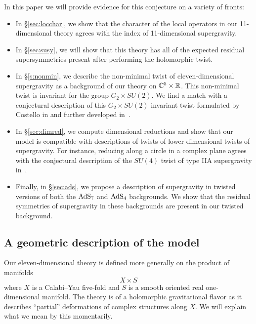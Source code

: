 In this paper we will provide evidence for this conjecture on a variety of fronts:
\begin{itemize}[leftmargin=\parindent,itemsep=\parskip]
\item 
In \S\ref{sec:locchar}, we show that the character of the local operators in our 11-dimensional theory agrees with the index of 11-dimensional supergravity. 
\item
In \S\ref{sec:susy}, we will show that this theory has all of the expected residual supersymmetries present after performing the holomorphic twist.

\item
In \S\ref{s:nonmin}, we describe the non-minimal twist of eleven-dimensional supergravity as a background of our theory on $\mathbb C^5 \times \mathbb R$. 
This non-minimal twist is invariant for the group $G_2 \times SU(2)$. 
We find a match with a conjectural description of this $G_2 \times SU(2)$ invariant twist formulated by Costello in \cite{CostelloM5} and further developed in~\cite{RY}.  
\item In \S\ref{sec:dimred}, we compute dimensional reductions and show that our model is compatible with descriptions of twists of lower dimensional twists of supergravity. 
For instance, reducing along a circle in a complex plane agrees with the conjectural description of the $SU(4)$ twist of type IIA supergravity in~\cite{CLsugra}.
\item
Finally, in \S\ref{sec:ads}, we propose a description of supergravity in twisted versions of both the ${\rm AdS}_7$ and ${\rm AdS}_4$ backgrounds. 
We show that the residual symmetries of supergravity in these backgrounds are present in our twisted background.
\end{itemize}

\subsection*{A geometric description of the model} 

Our eleven-dimensional theory is defined more generally on the product of manifolds 
\[
X \times S
\]
where $X$ is a Calabi--Yau five-fold and $S$ is a smooth oriented real one-dimensional manifold. 
The theory is of a holomorphic gravitational flavor as it describes ``partial'' deformations of complex structures along $X$. 
We will explain what we mean by this momentarily. 

